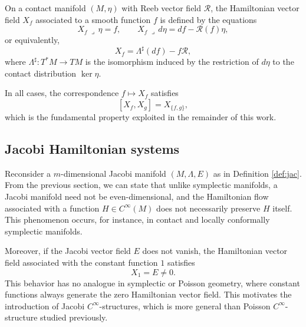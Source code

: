 \documentclass{article}
\theoremstyle{remark}
\theoremstyle{definition}
\newcommand{\contract}{\,\lrcorner\,}
\begin{document}
On a contact manifold $(M,\eta)$ with Reeb vector field $\mathcal{R}$, the Hamiltonian vector field $X_f$ associated to a smooth function $f$ is defined by the equations
\[
X_f\contract\eta = f, \qquad X_f\contract d\eta = df - \mathcal{R}(f)\eta,
\]
or equivalently,
\[
X_f = \Lambda^{\sharp}(df) - f\mathcal{R},
\]
where $\Lambda^\sharp: T^*M \to TM$ is the isomorphism induced by the restriction of $d\eta$ to the contact distribution $\ker\eta$. %

In all cases, the correspondence $f\mapsto X_f$ satisfies
\[
[X_f,X_g]=X_{\{f,g\}},
\]
which is the fundamental property exploited in the remainder of this work.



\subsection{Jacobi Hamiltonian systems}


Reconsider a $m$-dimensional Jacobi manifold $(M,\Lambda,E)$ as in Definition \ref{def:jac}.
From the previous section, we can state that unlike symplectic manifolds, a Jacobi manifold need not be
even-dimensional, and the Hamiltonian flow associated with a function
$H\in C^\infty(M)$ does not necessarily preserve $H$ itself. This phenomenon
occurs, for instance, in contact and locally conformally symplectic
manifolds.

Moreover, if the Jacobi vector field $E$ does not vanish, the Hamiltonian
vector field associated with the constant function $1$ satisfies
\[
X_1 = E \neq 0.
\]
This behavior has no analogue in symplectic or Poisson geometry, where
constant functions always generate the zero Hamiltonian vector field.
This motivates the introduction of Jacobi $C^\infty$-structures, which is more general than Poisson $C^\infty$-structure studied previously.
\end{document}
